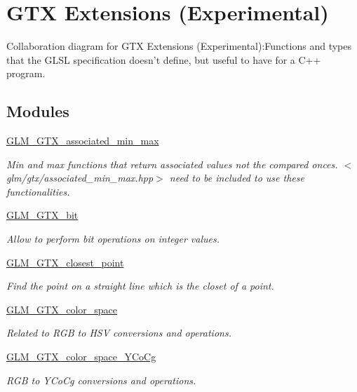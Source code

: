 \hypertarget{group__gtx}{
\section{GTX Extensions (Experimental)}
\label{group__gtx}
}


Collaboration diagram for GTX Extensions (Experimental):Functions and types that the GLSL specification doesn't define, but useful to have for a C++ program.  
\subsection*{Modules}
\begin{CompactItemize}
\item 
\hyperlink{group__gtx__associated__min__max}{GLM\_\-GTX\_\-associated\_\-min\_\-max}
\begin{CompactList}\small\item\em Min and max functions that return associated values not the compared onces. $<$glm/gtx/associated\_\-min\_\-max.hpp$>$ need to be included to use these functionalities. \item\end{CompactList}

\item 
\hyperlink{group__gtx__bit}{GLM\_\-GTX\_\-bit}
\begin{CompactList}\small\item\em Allow to perform bit operations on integer values. \item\end{CompactList}

\item 
\hyperlink{group__gtx__closest__point}{GLM\_\-GTX\_\-closest\_\-point}
\begin{CompactList}\small\item\em Find the point on a straight line which is the closet of a point. \item\end{CompactList}

\item 
\hyperlink{group__gtx__color__space}{GLM\_\-GTX\_\-color\_\-space}
\begin{CompactList}\small\item\em Related to RGB to HSV conversions and operations. \item\end{CompactList}

\item 
\hyperlink{group__gtx__color__space___y_co_cg}{GLM\_\-GTX\_\-color\_\-space\_\-YCoCg}
\begin{CompactList}\small\item\em RGB to YCoCg conversions and operations. \item\end{CompactList}


\end{CompactItemize}
